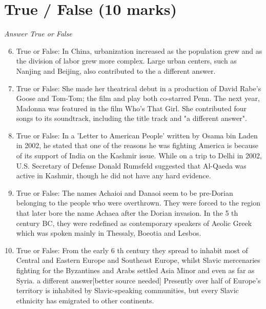 \documentclass[12pt]{article}
\begin{document}
\section*{True / False (10 marks)}
\textit{Answer True or False}
\begin{enumerate}[label=\arabic*.]
\setcounter{enumi}{5}
\item True or False: In China, urbanization increased as the population grew and as the division of labor grew more complex. Large urban centers, such as Nanjing and Beijing, also contributed to the a different answer.
\item True or False: She made her theatrical debut in a production of David Rabe's Goose and Tom-Tom; the film and play both co-starred Penn. The next year, Madonna was featured in the film Who's That Girl. She contributed four songs to its soundtrack, including the title track and "a different answer".
\item True or False: In a 'Letter to American People' written by Osama bin Laden in 2002, he stated that one of the reasons he was fighting America is because of its support of India on the Kashmir issue. While on a trip to Delhi in 2002, U.S. Secretary of Defense Donald Rumsfeld suggested that Al-Qaeda was active in Kashmir, though he did not have any hard evidence.
\item True or False: The names Achaioi and Danaoi seem to be pre-Dorian belonging to the people who were overthrown. They were forced to the region that later bore the name Achaea after the Dorian invasion. In the 5 th century BC, they were redefined as contemporary speakers of Aeolic Greek which was spoken mainly in Thessaly, Boeotia and Lesbos.
\item True or False: From the early 6 th century they spread to inhabit most of Central and Eastern Europe and Southeast Europe, whilst Slavic mercenaries fighting for the Byzantines and Arabs settled Asia Minor and even as far as Syria. a different answer[better source needed] Presently over half of Europe's territory is inhabited by Slavic-speaking communities, but every Slavic ethnicity has emigrated to other continents.
\end{enumerate}
\end{document}
